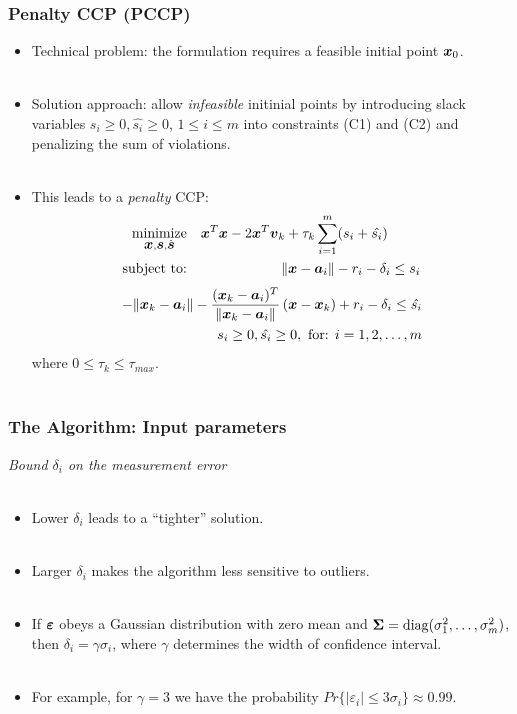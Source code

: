 \documentclass [t] {beamer} %
\begin{document}
\begin{frame} %
\frametitle{ Penalty CCP (PCCP) } 
\begin{itemize}
\item
Technical problem: the formulation requires a feasible initial point $\mbox{\boldmath$x$}_0$. \\~\\

\item
Solution approach: allow \textit{infeasible} initinial points by introducing slack variables {$s_i \geq 0, \hat{s_i} \geq 0$, $ 1\leq i \leq m$} into constraints (C1) and (C2) and penalizing the sum of violations. 
 \\~\\
\item
This leads to a \textit{penalty} CCP:%
\setlength{\belowdisplayskip}{0pt} \setlength{\belowdisplayshortskip}{0pt}
\begin{eqnarray} %
\nonumber
  \Min_{\Bx, \Bs, \hat{\Bs}}&&\Bx^T\Bx - 2\Bx^T \Bv_k + \tau_k \sum^m_{i=1} (s_i + \hat{s_i}) \qquad \  \\
\nonumber
\mbox{subject to:}&&\| \Bx - \Ba_i\| - r_i - \delta_i \leq s_i  
\end{eqnarray}
\begin{eqnarray}
\nonumber
 -\| \mbox{\boldmath$x$}_k - \mbox{\boldmath$a$}_i\| -\frac{(\mbox{\boldmath$x$}_k - \mbox{\boldmath$a$}_i)^T}{\| \mbox{\boldmath$x$}_k - \mbox{\boldmath$a$}_i\|}\left(\mbox{\boldmath$x$} - \mbox{\boldmath$x$}_k\right) + r_i - \delta_i   \leq \hat{s_i} \\
\nonumber
\qquad s_i \geq 0,  \hat{s_i}  \geq 0, \ \mbox{for: }  i = 1, 2, \ldots, m  
\end{eqnarray}
where $ 0 \leq \tau_k \leq \tau_{max}$.
\\~\\
\end{itemize}
\end{frame}


\begin{frame} %
\frametitle{The Algorithm: Input parameters}
{\large \textit{Bound $\delta_i$ on the measurement error}}
\\~\\
\begin{itemize}
\item
Lower $\delta_i$ leads to a ``tighter'' solution.
\\~\\
\item
 Larger $\delta_i$ makes the algorithm less sensitive to outliers.
\\~\\
\item
 If $\mbox{\boldmath${\varepsilon}$}$ obeys a Gaussian distribution with zero mean and $\mbox{\boldmath${\Sigma}$} = \mbox{diag}(\sigma_1^2, \ldots, \sigma_m^2)$, then $\delta_i = \gamma \sigma_i$, where $\gamma$ determines the width of  confidence interval.
 \\~\\
 \item
 For example, for $\gamma = 3$ we have the probability $Pr\{|\varepsilon_i| \leq 3\sigma_i\} \approx 0.99$.

\end{itemize}
\end{frame}
\end{document}
